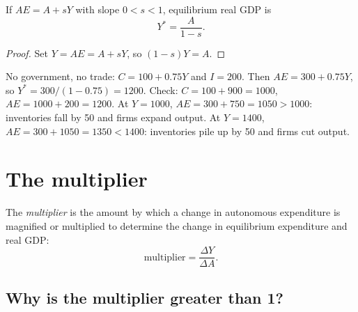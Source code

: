 \begin{theorem}
If $AE = A + sY$ with slope $0 < s < 1$, equilibrium real GDP is
\[
  Y^{*} = \frac{A}{1 - s}.
\]
\end{theorem}
\begin{proof}
Set $Y = AE = A + sY$, so $(1 - s)Y = A$.
\end{proof}

\begin{example}
No government, no trade: $C = 100 + 0.75Y$ and $I = 200$. Then $AE = 300 + 0.75Y$, so
$Y^{*} = 300/(1 - 0.75) = 1200$. Check: $C = 100 + 900 = 1000$, $AE = 1000 + 200 = 1200$.
At $Y = 1000$, $AE = 300 + 750 = 1050 > 1000$: inventories fall by 50 and firms expand
output. At $Y = 1400$, $AE = 300 + 1050 = 1350 < 1400$: inventories pile up by 50 and
firms cut output.
\end{example}

\begin{center}
\end{center}

\section{The multiplier}

\begin{definition}[Multiplier]
The \emph{multiplier} is the amount by which a change in autonomous expenditure is
magnified or multiplied to determine the change in equilibrium expenditure and real GDP:
\[
  \text{multiplier} = \frac{\Delta Y}{\Delta A}.
\]
\end{definition}

\subsection{Why is the multiplier greater than 1?}

